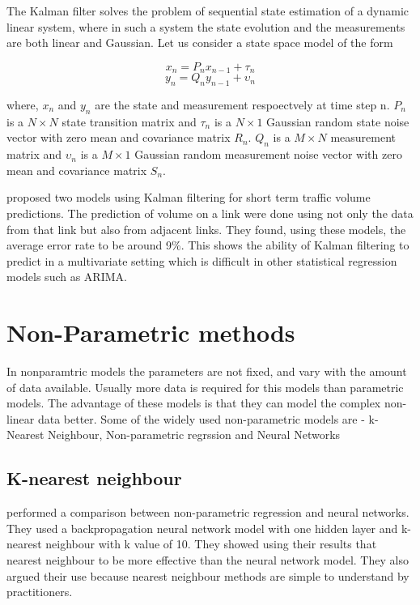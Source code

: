 The Kalman filter solves the problem of sequential state estimation of a dynamic linear system, where
in such a system the state evolution and the measurements are both linear and Gaussian. Let us consider
a state space model of the form

        \begin{equation} x_{n} = P_{n}x_{n-1} + \tau_{n} \end{equation}
        \begin{equation} y_{n} = Q_{n}y_{n-1} + \upsilon_{n} \end{equation}

where, $x_{n}$ and $y_{n}$ are the state and measurement respoectvely at time step n.
$P_{n}$ is a $N \times N$ state transition matrix and $\tau_{n}$ is a $N \times 1$ Gaussian
random state noise vector with zero mean and covariance matrix $R_{n}$. $Q_{n}$ is a $M \times N$
measurement matrix and $\upsilon_{n}$ is a $M \times 1$ Gaussian random measurement noise vector
with zero mean and covariance matrix $S_{n}$.


\citet{okutani1984dynamic} proposed two models using Kalman filtering for short term traffic volume
predictions. The prediction of volume on a link were done using not only the data from that link but
also from adjacent links. They found, using these models, the average error rate to be around 9\%.
This shows the ability of Kalman filtering to predict in a multivariate setting which is difficult in
other statistical regression models such as ARIMA.
\citet{stathopoulos2003multivariate}
\citet{xie2007short} \citet{guo2010real}
\citet{guo2014adaptive}

\section{Non-Parametric methods}
In nonparamtric models the parameters are not fixed, and vary with the amount of data available.
Usually more data is required for this models than parametric models. The advantage of these models
is that they can model the complex non-linear data better. Some of the widely used non-parametric
models are - k-Nearest Neighbour, Non-parametric regrssion and Neural Networks

\subsection{K-nearest neighbour}
\citet{smith1994comparison} performed a comparison between non-parametric regression and neural
networks. They used a backpropagation neural network model with one hidden layer and k-nearest
neighbour with k value of 10. They showed using their results that nearest neighbour to be more
effective than the neural network model. They also argued their use because nearest neighbour methods
are simple to understand by practitioners.
\citet{lv2009real}

